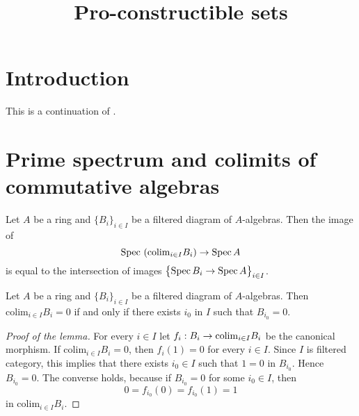 



\title{Pro-constructible sets}
\date{}
\maketitle

\section{Introduction}
\noindent
This is a continuation of \cite{Constructibleandlocallyconstructiblesets}.

\section{Prime spectrum and colimits of commutative algebras}

\begin{proposition}\label{proposition:imageofacolimitisanintersection}
Let $A$ be a ring and $\{B_i\}_{i\in I}$ be a filtered diagram of $A$-algebras. Then the image of
$$\mathrm{Spec}\, \left(\mathrm{colim}_{i\in I}B_i\right)\rightarrow \mathrm{Spec}\, A$$
is equal to the intersection of images $\big\{\mathrm{Spec}\, B_i\rightarrow \mathrm{Spec}\, A\big\}_{i\in I}$.
\end{proposition}

\begin{lemma}\label{lemma:colimitiszerosometermiszero}
Let $A$ be a ring and $\{B_i\}_{i\in I}$ be a filtered diagram of $A$-algebras. Then $\mathrm{colim}_{i\in I}B_i = 0$ if and only if there exists $i_0$ in $I$ such that $B_{i_0} = 0$.
\end{lemma}
\begin{proof}[Proof of the lemma]
For every $i\in I$ let $f_i:B_i\rightarrow \mathrm{colim}_{i\in I}B_i$ be the canonical morphism. If $\mathrm{colim}_{i\in I}B_i = 0$, then $f_i(1) = 0$ for every $i\in I$. Since $I$ is filtered category, this implies that there exists $i_0\in I$ such that $1 = 0$ in $B_{i_0}$. Hence $B_{i_0}=0$. The converse holds, because if $B_{i_0} = 0$ for some $i_0\in I$, then 
$$0 = f_{i_0}(0) = f_{i_0}(1) = 1$$
in $\mathrm{colim}_{i\in I}B_i$.
\end{proof}


